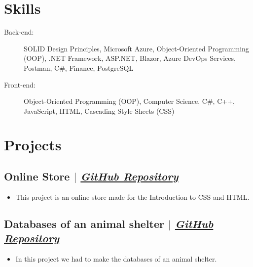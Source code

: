 \documentclass[11pt]{article}
\begin{document}
\section{Skills}
\begin{description}
    \item[Back‑end:]SOLID Design Principles, Microsoft Azure, Object-Oriented Programming (OOP), .NET Framework, ASP.NET, Blazor, Azure DevOps Services, Postman, C\#, Finance, PostgreSQL 
    \item[Front-end:]Object-Oriented Programming (OOP), Computer Science, C\#, C++, JavaScript, HTML, Cascading Style Sheets (CSS) 
\end{description}

\section{Projects}
\subsection{Online Store {\normalfont $|$ \href{https://github.com/den007s/denisprojects/blob/main/proiect-denispetraru\%20(2).zip}{\textit{GitHub Repository}}}}
\begin{itemize}
    \item This project is an online store made for the Introduction to CSS and HTML.
\end{itemize}
\subsection{Databases of an animal shelter {\normalfont $|$ \href{https://github.com/den007s/denisprojects/tree/main/Animal\%20Shelter}{\textit{GitHub Repository}}} }
\begin{itemize}
    \item In this project we had to make the databases of an animal shelter.
\end{itemize}
\end{document}
